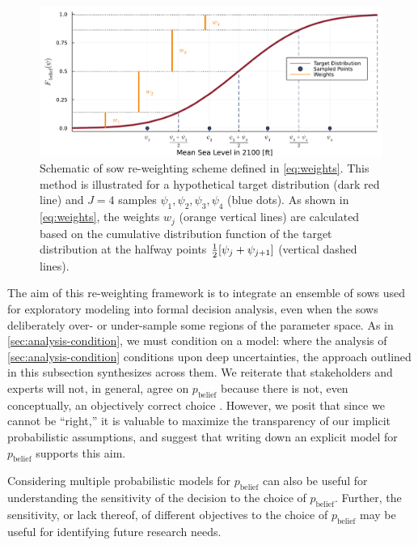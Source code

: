 \documentclass{agujournal2019}
\begin{document}
\begin{figure}
  \centering
  \includegraphics[width=\textwidth]{grid-sketch}
  \caption{
    Schematic of \gls{sow} re-weighting scheme defined in \cref{eq:weights}.
    This method is illustrated for a hypothetical target distribution (dark red line) and $J=4$ samples $\psi_1, \psi_2, \psi_3, \psi_4$ (blue dots).
    As shown in \cref{eq:weights}, the weights $w_j$ (orange vertical lines) are calculated based on the cumulative distribution function of the target distribution at the halfway points $\frac{1}{2}\qty[\psi_j+\psi_{j+1}]$ (vertical dashed lines).
  }\label{fig:grid-sketch}
\end{figure}

The aim of this re-weighting framework is to integrate an ensemble of \glspl{sow} used for exploratory modeling into formal decision analysis, even when the \glspl{sow} deliberately over- or under-sample some regions of the parameter space.
As in \cref{sec:analysis-condition}, we must condition on a model: where the analysis of \cref{sec:analysis-condition} conditions upon deep uncertainties, the approach outlined in this subsection synthesizes across them.
We reiterate that stakeholders and experts will not, in general, agree on $p_\mathrm{belief}$ because there is not, even conceptually, an objectively correct choice \cite{oreskes_verification:1994,walker_deep:2013}.
However, we posit that since we cannot be ``right,'' it is valuable to maximize the transparency of our implicit probabilistic assumptions, and suggest that writing down an explicit model for $p_\mathrm{belief}$ supports this aim.

Considering multiple probabilistic models for $p_\mathrm{belief}$ can also be useful for understanding the sensitivity of the decision to the choice of $p_\mathrm{belief}$.
Further, the sensitivity, or lack thereof, of different objectives to the choice of $p_\mathrm{belief}$ may be useful for identifying future research needs.
\end{document}
